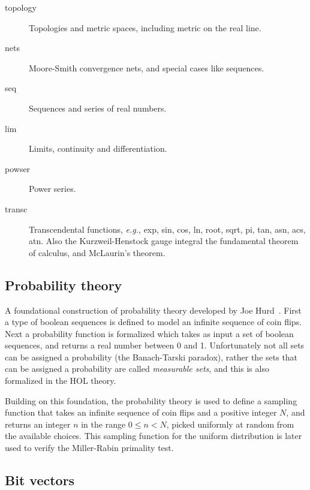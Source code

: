 \begin{description}
\item [topology] Topologies and metric spaces, including metric on
the real line.
\item [nets] Moore-Smith convergence nets, and special cases like
sequences.
\item [seq] Sequences and series of real numbers.
\item [lim] Limits, continuity and differentiation.
\item [powser] Power series.
\item [transc] Transcendental functions, \emph{e.g.}, exp, sin,
cos, ln, root, sqrt, pi, tan, asn, acs, atn. Also the Kurzweil-Henstock
gauge integral the fundamental theorem of calculus, and McLaurin's
theorem.

\end{description}

\subsection{Probability theory}\label{prob}

A foundational construction of probability theory developed by Joe
Hurd~\cite{hurd-thesis}. First a type of boolean sequences is defined
to model an infinite sequence of coin flips. Next a probability
function is formalized which takes as input a set of boolean
sequences, and returns a real number between 0 and 1. Unfortunately
not all sets can be assigned a probability (the Banach-Tarski
paradox), rather the sets that can be assigned a probability are
called \emph{measurable sets}, and this is also formalized in the
HOL theory.

Building on this foundation, the probability theory is used to define
a sampling function that takes an infinite sequence of coin flips and
a positive integer $N$, and returns an integer $n$ in the range $0\le
n < N$, picked uniformly at random from the available choices. This
sampling function for the uniform distribution is later used to verify
the Miller-Rabin primality test.

\subsection{Bit vectors}
\label{sec:bit-vectors}

